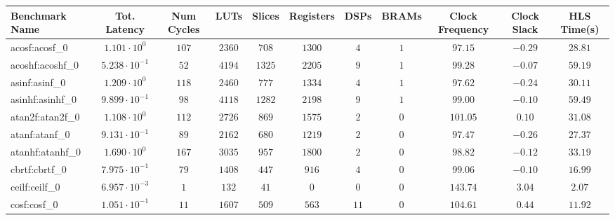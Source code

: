 \begin{tabular}{|l|c|c|c|c|c|c|c|c|c|c|}
\hline
Benchmark Name               & Tot. Latency            & Num Cycles & LUTs      & Slices    & Registers & DSPs    & BRAMs & Clock Frequency & Clock Slack & HLS Time(s) \\
\hline
acosf:acosf\_0               & $ 1.101 \cdot 10^{0}  $ & $ 107    $ & $ 2360  $ & $ 708   $ & $ 1300  $ & $ 4   $ & $ 1 $ & $ 97.15       $ & $ -0.29   $ & $ 28.81   $ \\
acoshf:acoshf\_0             & $ 5.238 \cdot 10^{-1} $ & $ 52     $ & $ 4194  $ & $ 1325  $ & $ 2205  $ & $ 9   $ & $ 1 $ & $ 99.28       $ & $ -0.07   $ & $ 59.19   $ \\
asinf:asinf\_0               & $ 1.209 \cdot 10^{0}  $ & $ 118    $ & $ 2460  $ & $ 777   $ & $ 1334  $ & $ 4   $ & $ 1 $ & $ 97.62       $ & $ -0.24   $ & $ 30.11   $ \\
asinhf:asinhf\_0             & $ 9.899 \cdot 10^{-1} $ & $ 98     $ & $ 4118  $ & $ 1282  $ & $ 2198  $ & $ 9   $ & $ 1 $ & $ 99.00       $ & $ -0.10   $ & $ 59.49   $ \\
atan2f:atan2f\_0             & $ 1.108 \cdot 10^{0}  $ & $ 112    $ & $ 2726  $ & $ 869   $ & $ 1575  $ & $ 2   $ & $ 0 $ & $ 101.05      $ & $ 0.10    $ & $ 31.08   $ \\
atanf:atanf\_0               & $ 9.131 \cdot 10^{-1} $ & $ 89     $ & $ 2162  $ & $ 680   $ & $ 1219  $ & $ 2   $ & $ 0 $ & $ 97.47       $ & $ -0.26   $ & $ 27.37   $ \\
atanhf:atanhf\_0             & $ 1.690 \cdot 10^{0}  $ & $ 167    $ & $ 3035  $ & $ 957   $ & $ 1800  $ & $ 2   $ & $ 0 $ & $ 98.82       $ & $ -0.12   $ & $ 33.19   $ \\
cbrtf:cbrtf\_0               & $ 7.975 \cdot 10^{-1} $ & $ 79     $ & $ 1408  $ & $ 447   $ & $ 916   $ & $ 4   $ & $ 0 $ & $ 99.06       $ & $ -0.10   $ & $ 16.99   $ \\
ceilf:ceilf\_0               & $ 6.957 \cdot 10^{-3} $ & $ 1      $ & $ 132   $ & $ 41    $ & $ 0     $ & $ 0   $ & $ 0 $ & $ 143.74      $ & $ 3.04    $ & $ 2.07    $ \\
cosf:cosf\_0                 & $ 1.051 \cdot 10^{-1} $ & $ 11     $ & $ 1607  $ & $ 509   $ & $ 563   $ & $ 11  $ & $ 0 $ & $ 104.61      $ & $ 0.44    $ & $ 11.92   $ \\

\end{tabular}
